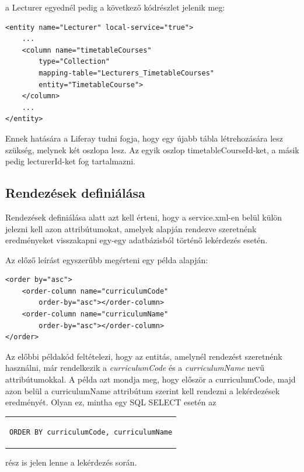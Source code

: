\documentclass[hidelinks, 12pt, a4paper]{report}
\begin{document}
a Lecturer egyednél pedig a következő kódrészlet jelenik meg:

\begin{minipage}{\linewidth}
\begin{lstlisting}[basicstyle=\small]
<entity name="Lecturer" local-service="true">
	...
	<column name="timetableCourses"
		type="Collection"
		mapping-table="Lecturers_TimetableCourses"
		entity="TimetableCourse">
	</column>
	...
</entity>
\end{lstlisting}
\end{minipage}

Ennek hatására a Liferay tudni fogja, hogy egy újabb tábla létrehozására lesz szükség, melynek két oszlopa lesz. Az egyik oszlop timetableCourseId-ket, a másik pedig lecturerId-ket fog tartalmazni.

\subsection{Rendezések definiálása}

Rendezések definiálása alatt azt kell érteni, hogy a service.xml-en belül külön jelezni kell azon attribútumokat, amelyek alapján rendezve szeretnénk eredményeket visszakapni egy-egy adatbázisból történő lekérdezés esetén.

Az előző leírást egyszerűbb megérteni egy példa alapján:

\begin{minipage}{\linewidth}
\begin{lstlisting}
<order by="asc">
	<order-column name="curriculumCode"
		order-by="asc"></order-column>
	<order-column name="curriculumName"
		order-by="asc"></order-column>
</order>
\end{lstlisting}
\end{minipage}

Az előbbi példakód feltételezi, hogy az entitás, amelynél rendezést szeretnénk használni, már rendelkezik a \emph{curriculumCode} és a \emph{curriculumName} nevű attribútumokkal. A példa azt mondja meg, hogy először a curriculumCode, majd azon belül a curriculumName attribútum szerint kell rendezni a lekérdezések eredményét. Olyan ez, mintha egy SQL SELECT esetén az
\begin{center}
\begin{tabular}{c}
\begin{lstlisting}
ORDER BY curriculumCode, curriculumName
\end{lstlisting}
\end{tabular}
\end{center}
rész is jelen lenne a lekérdezés során.
\end{document}
